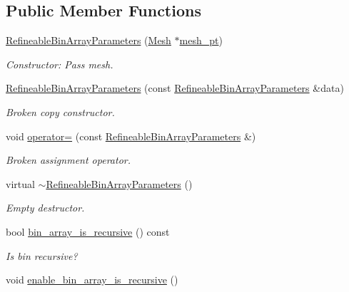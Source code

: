 \subsection*{Public Member Functions}
\begin{DoxyCompactItemize}
\item 
\hyperlink{classoomph_1_1RefineableBinArrayParameters_a818b4740e10aa5869981ce9f5bf1193e}{Refineable\+Bin\+Array\+Parameters} (\hyperlink{classoomph_1_1Mesh}{Mesh} $\ast$\hyperlink{classoomph_1_1SamplePointContainerParameters_a92bcab955d47e99d47b601253da7b6b2}{mesh\+\_\+pt})
\begin{DoxyCompactList}\small\item\em Constructor\+: Pass mesh. \end{DoxyCompactList}\item 
\hyperlink{classoomph_1_1RefineableBinArrayParameters_a2f1ba6468651705363da2637e9a142b9}{Refineable\+Bin\+Array\+Parameters} (const \hyperlink{classoomph_1_1RefineableBinArrayParameters}{Refineable\+Bin\+Array\+Parameters} \&data)
\begin{DoxyCompactList}\small\item\em Broken copy constructor. \end{DoxyCompactList}\item 
void \hyperlink{classoomph_1_1RefineableBinArrayParameters_a5b307d5acebd67ad9ce7745b848da5a6}{operator=} (const \hyperlink{classoomph_1_1RefineableBinArrayParameters}{Refineable\+Bin\+Array\+Parameters} \&)
\begin{DoxyCompactList}\small\item\em Broken assignment operator. \end{DoxyCompactList}\item 
virtual \hyperlink{classoomph_1_1RefineableBinArrayParameters_afc0752c4b4731443b5ec6e960afa61ae}{$\sim$\+Refineable\+Bin\+Array\+Parameters} ()
\begin{DoxyCompactList}\small\item\em Empty destructor. \end{DoxyCompactList}\item 
bool \hyperlink{classoomph_1_1RefineableBinArrayParameters_a0e7008ab131125dd1ed4118f5953848a}{bin\+\_\+array\+\_\+is\+\_\+recursive} () const
\begin{DoxyCompactList}\small\item\em Is bin recursive? \end{DoxyCompactList}\item 
void \hyperlink{classoomph_1_1RefineableBinArrayParameters_ac06c56e4dd074e6f133e0708dc7a1fb7}{enable\+\_\+bin\+\_\+array\+\_\+is\+\_\+recursive} ()

\end{DoxyCompactItemize}
